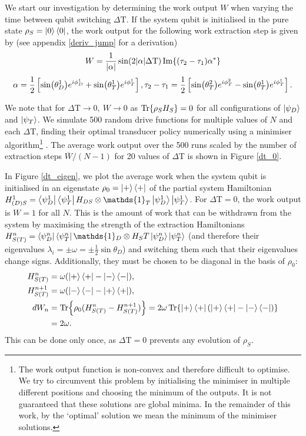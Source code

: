 We start our investigation by determining the work output $W$ when varying the time between qubit switching $\Delta \mathrm{T}$.
If the system qubit is initialised in the pure state $\rho_S = \ket{0} \bra{0}$, the work output for the following work extraction step is given by (see appendix \ref{deriv_jump} for a derivation)
\begin{equation} \label{single_work}
	W = \frac{1}{\abs{\alpha}} \sin(2\abs{\alpha}\Delta \mathrm{T}) \Im{(\tau_2 - \tau_1) \alpha^*}
\end{equation}
\begin{equation*}
	\alpha = \frac{1}{2} \left[\sin(\theta_D^1) e^{i\phi_D^1} + \sin(\theta_T^1) e^{i\phi_T^1}\right], \\
	\tau_2 - \tau_1 = \frac{1}{2} \left[ \sin(\theta_T^2)e^{i\phi_T^2} - \sin(\theta_T^1)e^{i\phi_T^1} \right].
\end{equation*}

We note that for $\Delta \mathrm{T} \to 0, \ W \to 0$ as $\Tr{\rho_S H_S} = 0$ for all configurations of $\ket{\psi_D}$ and $ \ket{\psi_T}$.
We simulate 500 random drive functions for multiple values of $N$ and each $\Delta \mathrm{T}$, finding their optimal transducer policy numerically using a minimiser algorithm\footnote{The work output function is non-convex and therefore difficult to optimise. We try to circumvent this problem by initialising the minimiser in multiple different positions and choosing the minimum of the outputs. It is not guaranteed that these solutions are global minima. In the remainder of this work, by the `optimal' solution we mean the minimum of the minimiser solutions.} \cite{2020SciPy-NMeth}. The average work output over the 500 runs scaled by the number of extraction steps $\overline{W}/(N-1)$ for 20 values of $\Delta \mathrm{T}$ is shown in Figure \ref{dt_0}.

In Figure \ref{dt_eigen}, we plot the average work when the system qubit is initialised in an eigenstate $\rho_0 = \ket{+}\bra{+}$ of the partial system Hamiltonian $H^1_{(D)S} = \bra{\psi_D^1} \bra{\psi_T^{1}} H_{DS} \otimes \mathds{1}_T \ket{\psi_D^1} \ket{\psi_T^1}$.
For $\Delta \mathrm{T} = 0$, the work output is $W = 1$ for all $N$.
This is the amount of work that can be withdrawn from the system by maximising the strength of the extraction Hamiltonians $H^n_{S(T)} = \bra{\psi_D^n} \bra{\psi_T^{n}} \mathds{1}_D \otimes H_ST  \ket{\psi_D^n} \ket{\psi_T^n}$ (and therefore their eigenvalues $\lambda_i = \pm \omega = \pm \frac{1}{2} \sin \theta_D$) and switching them such that their eigenvalues change signs. Additionally, they must be chosen to be diagonal in the basis of $\rho_0$:
\begin{align*}
	H_{S(T)}^n &= \omega (\ket{+}\bra{+} - \ket{-}\bra{-}), \\
	H_{S(T)}^{n+1} &= \omega (\ket{-}\bra{-} - \ket{+}\bra{+}), \\
	dW_n &= \Tr{\rho_0 (H_{S(T)}^n - H_{S(T)}^{n+1})} = 2 \omega \Tr{\ket{+}\bra{+} (\ket{+}\bra{+} - \ket{-}\bra{-}) } \\
	&= 2 \omega.
\end{align*}
This can be done only once, as $\Delta \mathrm{T} = 0$ prevents any evolution of $\rho_S$.

